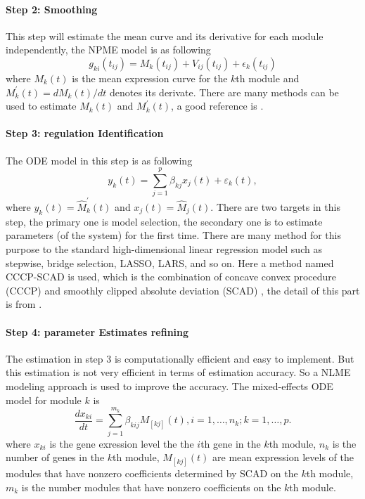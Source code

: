 \documentclass[12pt]{extarticle}
\begin{document}
\paragraph{Step 2: Smoothing}
This step will estimate the mean curve and its derivative for each module independently, the NPME model is as following \cite{Wu02}
\begin{equation}
g_{ki}(t_{ij})=M_{k}(t_{ij})+V_{ij}(t_{ij})+\epsilon_{k}(t_{ij})
\end{equation}
where $M_{k}(t)$ is the mean expression curve for the $k$th module and $M_{k}^{'}(t)=dM_{k}(t)/dt$ denotes its derivate. There are many methods can be used to estimate $M_{k}(t)$ and $M_{k}^{'}(t)$, a good reference is \cite{Wu06}.
\paragraph{Step 3: regulation Identification}
The ODE model in this step is as following
\begin{equation}
y_{k}(t)=\sum_{j=1}^{p}\beta_{kj}x_{j}(t)+\varepsilon_{k}(t),
\end{equation}
where $y_{k}(t)=\hat{M}_{k}^{'}(t)$ and $x_{j}(t)=\hat{M}_{j}(t)$.
There are two targets in this step, the primary one is model selection, the secondary one is to estimate parameters (of the system) for the first time. There are many method for this purpose to the standard high-dimensional linear regression model such as stepwise, bridge selection, LASSO, LARS, and so on. Here a method named CCCP-SCAD is used, which is the combination of concave convex procedure (CCCP) \cite{Le97} and smoothly clipped absolute deviation (SCAD) \cite{Fan01}, the detail of this part is from \cite{Kim08}.
\paragraph{Step 4: parameter Estimates refining}
The estimation in step 3 is computationally efficient and easy to implement. But this estimation is not very efficient in terms of estimation accuracy. So a NLME modeling approach is used to improve the accuracy.
The mixed-effects ODE model for module $k$ is
\begin{equation}
\frac{dx_{ki}}{dt}=\sum_{j=1}^{m_k}\beta_{kij}M_{[kj]}(t), i=1,\ldots,n_k; k=1,\ldots,p. \label{s41}
\end{equation}
where $x_{ki}$ is the gene exression level the the $i$th gene in the $k$th module, $n_k$ is the number of genes in the $k$th module, $M_{[kj]}(t)$ are mean expression levels of the modules that have nonzero coefficients determined by SCAD on the $k$th module, $m_k$ is the number modules that have nonzero coefficients on the $k$th module.
\end{document}

